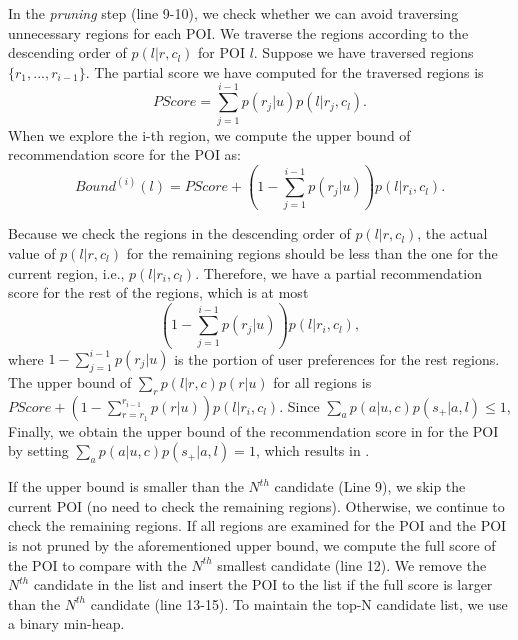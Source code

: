 In the \emph{pruning} step (line 9-10),
we check whether we can avoid traversing unnecessary regions for each POI.
We traverse the regions according to
the descending order of $p(l|r,c_l)$ for POI $l$. Suppose we have traversed regions
$\{r_1,...,r_{i-1}\}$. The partial score we have computed for the traversed regions is
\[PScore=\sum_{j=1}^{i-1}{p(r_j|u)p(l|r_j,c_l)}.\]
When we explore the i-th region, we compute the upper bound of
recommendation score for the POI as:
\begin{equation}
\label{eq:bound}
Bound^{(i)}(l)=PScore+(1-\sum_{j=1}^{i-1}{p(r_j|u)})p(l|r_i,c_l).
\end{equation}

Because we check the regions in the descending
order of $p(l|r,c_l)$, the actual value of $p(l|r,c_l)$
for the remaining regions should be less than the one
for the current region, i.e., $p(l|r_i,c_l)$.
Therefore, we have a partial recommendation
score for the rest of the regions, which is at most
\[(1-\sum_{j=1}^{i-1}{p(r_j|u)})p(l|r_i,c_l),\]
where
$1-\sum_{j=1}^{i-1}{{p(r_j|u)}}$ is the portion of user preferences for
the rest regions. The upper bound of
$\sum_r{p(l|r,c)p(r|u)}$ for all regions is
$PScore+(1-\sum_{r=r_1}^{r_{i-1}}{p(r|u)})p(l|r_i,c_l)$.
Since $\sum_a{p(a|u,c)p(s_+|a,l)}\le1$,
Finally, we obtain the upper bound of the recommendation score in 
for the POI
by setting $\sum_a{p(a|u,c)p(s_+|a,l)}=1$, which results in
.

If the upper bound
is smaller than the $N^{th}$ candidate (Line 9),
we skip the current POI (no need to check the remaining regions).
Otherwise, we continue to check the
remaining regions.
If all regions are examined for the POI and the POI is not pruned by the aforementioned
upper bound, we compute the full score
of the POI to compare with the $N^{th}$ smallest candidate (line 12).
We remove the $N^{th}$ candidate
in the list and insert the POI to the list if the full score is
larger than the $N^{th}$ candidate (line 13-15). To maintain the
top-N candidate list, we use a binary min-heap.

